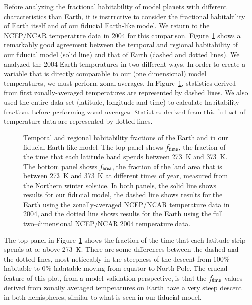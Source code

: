Before analyzing the fractional habitability of model planets with
different characteristics than Earth, it is instructive to consider
the fractional habitability of Earth itself and of our fiducial
Earth-like model.  We return to the NCEP/NCAR temperature data in 2004
for this comparison.  Figure~\ref{hab_fig:hab_comp} shows a remarkably
good agreement between the temporal and regional habitability of our
fiducial model (solid line) and that of Earth (dashed and dotted
lines).  We analyzed the 2004 Earth temperatures in two different
ways.  In order to create a variable that is directly comparable to
our (one dimensional) model temperatures, we must perform zonal
averages.  In Figure~\ref{hab_fig:hab_comp}, statistics derived from
first zonally-averaged temperatures are represented by dashed lines.
We also used the entire data set (latitude, longitude and time) to
calculate habitability fractions before performing zonal averages.
Statistics derived from this full set of temperature data are
represented by dotted lines.
\begin{figure}[p]
\caption[Temporal and regional habitability fractions of the Earth and
in fiducial Earth-like model.]{Temporal and regional habitability
fractions of the Earth and in our fiducial Earth-like model.  The top
panel shows $f_{\rm time}$, the fraction of the time that each
latitude band spends between 273~K and 373~K.  The bottom panel shows
$f_{\rm area}$, the fraction of the land area that is between 273~K
and 373~K at different times of year, measured from the Northern
winter solstice.  In both panels, the solid line shows results for our
fiducial model, the dashed line shows results for the Earth using the
zonally-averaged NCEP/NCAR temperature data in 2004, and the dotted
line shows results for the Earth using the full two--dimensional
NCEP/NCAR 2004 temperature data.}
\label{hab_fig:hab_comp}
\end{figure}
\afterpage{\clearpage}

The top panel in Figure~\ref{hab_fig:hab_comp} shows the fraction of
the time that each latitude strip spends at or above 273~K.  There are
some differences between the dashed and the dotted lines, most
noticeably in the steepness of the descent from 100\% habitable to 0\%
habitable moving from equator to North Pole.  The crucial feature of
this plot, from a model validation perspective, is that the $f_{\rm
time}$ values derived from zonally averaged temperatures on Earth have
a very steep descent in both hemispheres, similar to what is seen in
our fiducial model.

